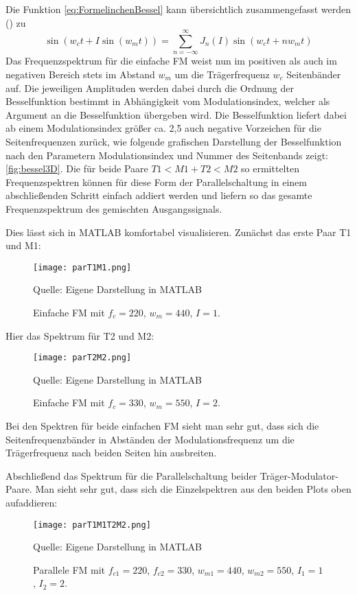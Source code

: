 Die Funktion \ref{eq:FormelinchenBessel} kann übersichtlich zusammengefasst werden (\cite{schottstaedtWeb}) zu 
\begin{equation}\label{esq:Besselbabymonster}
\sin(w_ct + I\sin(w_mt)) = \sum_{n=-\infty}^{\infty}J_n(I)\sin(w_ct+nw_mt)
\end{equation}
Das Frequenzspektrum für die einfache FM weist nun im positiven als auch im negativen Bereich stets im Abstand \begin{math} w_m \end{math} um die Trägerfrequenz \begin{math} w_c \end{math} Seitenbänder auf. Die jeweiligen Amplituden werden dabei durch die Ordnung der Besselfunktion bestimmt in Abhängigkeit vom Modulationsindex, welcher als Argument an die Besselfunktion übergeben wird. Die Besselfunktion liefert dabei ab einem Modulationsindex größer ca. 2,5 auch negative Vorzeichen für die Seitenfrequenzen zurück, wie folgende grafischen Darstellung der Besselfunktion nach den Parametern Modulationsindex und Nummer des Seitenbands zeigt: \ref{fig:bessel3D}. Die für beide Paare $T1<M1 + T2<M2$ so ermittelten Frequenzspektren können für diese Form der Parallelschaltung in einem abschließenden Schritt einfach addiert werden und liefern so das gesamte Frequenzspektrum des gemischten Ausgangssignals. 

Dies lässt sich in MATLAB komfortabel visualisieren. Zunächst das erste Paar T1 und M1:
\FloatBarrier
\begin{figure} [ht]
\centering
  \texttt{[image: parT1M1.png]}
\caption{Einfache FM mit $f_c = 220$, $w_m = 440$, $I = 1$. }
Quelle: Eigene Darstellung in MATLAB
\end{figure}
\FloatBarrier
Hier das Spektrum für T2 und M2:
\FloatBarrier
\begin{figure} [ht]
\centering
  \texttt{[image: parT2M2.png]}
\caption{Einfache FM mit $f_c = 330$, $w_m = 550$, $I = 2$. }
Quelle: Eigene Darstellung in MATLAB
\end{figure}
\FloatBarrier
Bei den Spektren für beide einfachen FM sieht man sehr gut, dass sich die Seitenfrequenzbänder in Abständen der Modulationsfrequenz um die Trägerfrequenz nach beiden Seiten hin ausbreiten.

Abschließend das Spektrum für die Parallelschaltung beider Träger-Modulator-Paare. Man sieht sehr gut, dass sich die Einzelspektren aus den beiden Plots oben aufaddieren: 
\FloatBarrier
\begin{figure} [ht]
\centering
  \texttt{[image: parT1M1T2M2.png]}
\caption{Parallele FM mit $f_{c1} = 220$, $f_{c2} = 330$, $w_{m1} = 440$, $w_{m2} = 550$, $I_1 = 1$, $I_2 = 2$. }
Quelle: Eigene Darstellung in MATLAB
\end{figure}
\FloatBarrier

